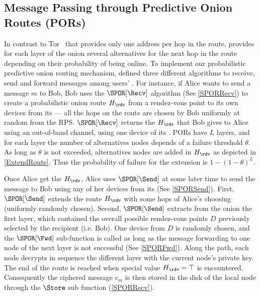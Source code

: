 
\subsection{Message Passing through Predictive Onion Routes (PORs)}
\label{sec:message_passing}




In contrast to Tor~\cite{Tor} that provides only one address per hop
in the route, \name provides for each layer of the onion several
alternatives for the next hop in the route depending on their
probability of being online. To implement our  probabilistic
predictive onion routing mechanism, \name defined three different algorithms to
receive, send and forward messages among users' \squad. For instance,
if Alice wants to send a message \(m\) to Bob, Bob uses the
\(\SPOR[\Recv]\) algorithm (See \cref{SPORRecv}) to create a probabilistic onion route \(H_\rdv\) from
 a rendez-vous point to its own devices from its \squad --- all the hops on the route are 
chosen by Bob uniformly at random from the RPS. \(\SPOR[\Recv]\)
returns the \(H_\rdv\) that Bob gives to Alice using an
out-of-band channel, \eg using one device of its \squad.
PORs have \(L\) layers, and for each layer the number of
alternatives nodes depends of a failure threshold \(\theta\). 
As long as \(\theta\) is not exceeded, alternatives nodes are added in
\(H_\rdv\) as depicted in \cref{ExtendRoute}. Thus the probability of
failure for the extension is \(1 - (1 - \theta)^L\).


Once Alice get the \(H_\rdv\), Alice uses \(\SPOR[\Send]\) at some
later time to send the message to Bob using any of her devices from
its \squad (See \cref{SPORSend}). First, \(\SPOR[\Send]\) extends the route
\(H_\rdv\) with some hops of Alice's choosing (uniformly randomly
chosen). Second, \(\SPOR[\Send]\) extracts from the onion the first
layer, which contained the overall
possible rendez-vous points $D$ previously selected by the recipient (i.e. Bob).
One device from $D$ is randomly chosen, and the \(\SPOR[\Fwd]\)
sub-function is called as long as the message forwarding to one node of
the next layer is not successful (See \cref{SPORFwd}). Along the path, each node decrypts
in sequence the different layer with the current node’s private key. 
The end of the route is reached when special value \(H_\rdv = \top\) is
encountered. Consequently the ciphered message \(c_m\) is then stored
in the disk of the local node through the \(\Store\) sub function 
(\cref{SPORRecv}).

